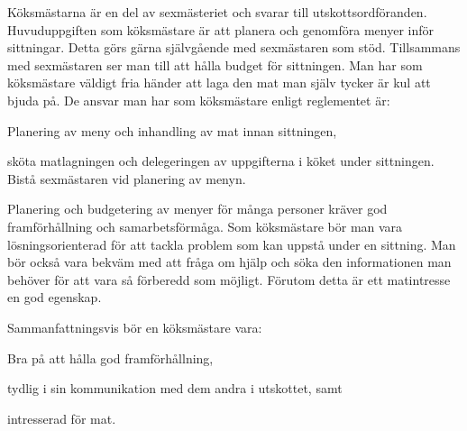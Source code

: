 \documentclass[10pt]{article}
\def\post{Köksmästare}
\def\doctitle{Kravprofil för \post}
\begin{document}
\heading{\doctitle}

Köksmästarna är en del av sexmästeriet och svarar till utskottsordföranden. Huvuduppgiften som köksmästare är att planera och genomföra menyer inför sittningar. Detta görs gärna självgående med sexmästaren som stöd. Tillsammans med sexmästaren ser man till att hålla budget för sittningen. Man har som köksmästare väldigt fria händer att laga den mat man själv tycker är kul att bjuda på. 
De ansvar man har som köksmästare enligt reglementet är:
\begin{dashlist}
    \item Planering av meny och inhandling av mat innan sittningen,
    \item sköta matlagningen och delegeringen av uppgifterna i köket under sittningen. Bistå sexmästaren vid planering av menyn.        
\end{dashlist}

Planering och budgetering av menyer för många personer kräver god framförhållning och samarbetsförmåga. Som köksmästare bör man vara lösningsorienterad för att tackla problem som kan uppstå under en sittning. Man bör också vara bekväm med att fråga om hjälp och söka den informationen man behöver för att vara så förberedd som möjligt. Förutom detta är ett matintresse en god egenskap. 

Sammanfattningsvis bör en köksmästare vara:
\begin{dashlist}
    \item Bra på att hålla god framförhållning,
    \item tydlig i sin kommunikation med dem andra i utskottet, samt
    \item intresserad för mat.    
\end{dashlist}    
\end{document}
